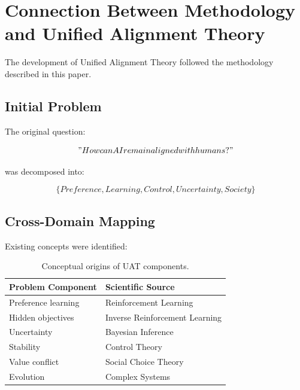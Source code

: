 \documentclass[11pt]{article}
\begin{document}
\section{Connection Between Methodology and Unified Alignment Theory}


The development of Unified Alignment Theory followed the methodology
described in this paper.



\subsection{Initial Problem}


The original question:


\[
"How can AI remain aligned with humans?"
\]


was decomposed into:


\[
\{
Preference,
Learning,
Control,
Uncertainty,
Society
\}
\]



\subsection{Cross-Domain Mapping}


Existing concepts were identified:


\begin{table}[h]

\centering

\begin{tabular}{ll}

\toprule

Problem Component & Scientific Source \\

\midrule

Preference learning
& Reinforcement Learning
\\

Hidden objectives
& Inverse Reinforcement Learning
\\

Uncertainty
& Bayesian Inference
\\

Stability
& Control Theory
\\

Value conflict
& Social Choice Theory
\\

Evolution
& Complex Systems
\\

\bottomrule

\end{tabular}


\caption{
Conceptual origins of UAT components.
}

\end{table}
\end{document}
